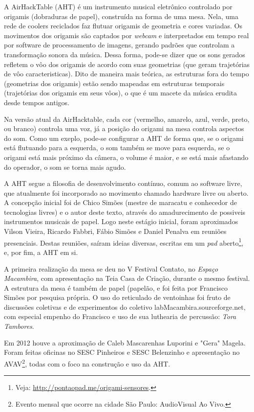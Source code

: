 A AirHackTable (AHT) é um instrumento musical eletrônico controlado por
origamis (dobraduras de papel), construída na forma de uma mesa. Nela,
uma rede de coolers reciclados faz flutuar origamis de geometria e
cores variadas. Os movimentos dos origamis são captados por \emph{webcam} e
interpretados em tempo real por software de processamento de imagens,
gerando padrões que controlam a transformação sonora da música. Dessa
forma, pode-se dizer que os sons gerados refletem o vôo dos origamis
de acordo com suas geometrias (que geram trajetórias de vôo
caracteristicas). Dito de maneira mais teórica, as estruturas fora
do tempo (geometrias dos origamis) estão sendo mapeadas em estruturas
temporais (trajetórias dos origamis em seus vôos), o que é um macete
da música erudita desde tempos antigos.

Na versão atual da AirHacktable, cada cor (vermelho, amarelo, azul,
verde, preto, ou branco) controla uma voz, já a posição do origami na
mesa controla aspectos do som. Como um exeplo, pode-se
configurar a AHT de forma que, se o origami está
flutuando para a esquerda, o som também se move para esquerda, se
o origami está mais próximo da câmera, o volume é maior, e se está
mais afastando do operador, o som se torna mais agudo.

A AHT segue a filosofia de desenvolvimento contínuo, comum ao software
livre, que atualmente foi incorporado ao movimento chamado hardware
livre ou aberto. A concepção inicial foi de Chico Simões (mestre de maracatu
e conhecedor de tecnologias livres) e o autor
deste texto, através do amadurecimento de possiveis instrumentos musicais de papel. 
Logo neste estágio inicial, foram aproximados Vilson Vieira, Ricardo Fabbri, Fábio Simões
e Daniel Penalva em reuniões presenciais. Destas reuniões, saíram ideias
diversas, escritas em um \emph{pad} aberto\footnote{Veja: \url{http://pontaopad.me/origami-sensores}.},
e, por fim, a AHT em si.

A primeira realização da mesa se deu no V Festival Contato, no \emph{Espaço Macambira},
com apresentação na Teia Casa de Criação, durante o mesmo festival. A estrutura
da mesa é também de papel (papelão, e foi feita
por Francisco Simões por pesquisa própria. O uso do reticulado de ventoinhas foi fruto
de discussões coletivas e de experimentos do coletivo labMacambira.sourceforge.net,
com especial empenho do Francisco e uso de sua luthearia de percussão: \emph{Tora Tambores}.

Em 2012 houve a aproximação de Caleb Mascarenhas Luporini e "Gera" Magela.
Foram feitas oficinas no SESC Pinheiros e SESC Belenzinho e apresentação
no AVAV\footnote{Evento mensal que ocorre na cidade São Paulo: AudioVisual Ao Vivo.},
todas com o foco na construção e uso da AHT.


